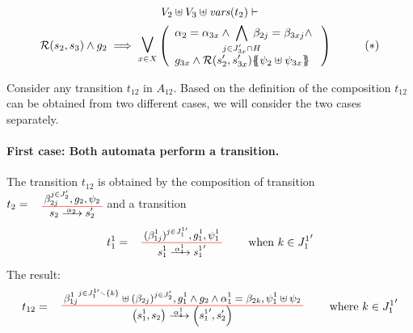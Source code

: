 \documentclass[runningheads]{llncs}
\begin{document}
\begin{enumerate}
\begin{multline*}
V_2 \uplus V_3 \uplus \fvars{t_2} \vdash\\ \mathcal{R}\mpar{s_2, s_3} \wedge g_2 \implies \operatorname*{\bigsymb{\bigvee}}_{x \in X} \mpar{\everymath{\displaystyle}
\begin{array}{l}
			\alpha_2 = \alpha_{3x} \wedge \bigwedge_\subbox{j \in J'_{3x} \cap H} \beta_{2j} = \beta_{3xj} \nwedge\\
			 g_{3x} \wedge \mathcal{R}\mpar{s'_2, s'_{3x}}\psubst{\psi_2 \uplus \psi_{3x}}
		\end{array}}  \qquad \quad (*)
\end{multline*}	
\smallskip



Consider any transition $t_{12}$ in $A_{12}$. Based on the definition of the composition  $t_{12}$ can be obtained from two different cases,  we will consider the two cases
separately.


\paragraph{First case: Both automata perform a transition.} The transition $t_{12}$  is obtained by the composition of transition $t_2=\OTx{2}{}{2}{2}$ and a transition \[t_1^1=
\OT{ s^1_1}{{s^1_1}'}{\alpha_1^1}{   {(\beta^1_{1j})^{j \in J^{1 \prime}_1} }}{ g^1_1 }{ \psi^1_1} \qquad \text{ when } k \in {J^1_{1}}^{\prime}
\] The result:
\[
t_{12} = \OT{\mpar{s^1_1, s_2}}{\mpar{{s^1_1}',s'_2 }}{\alpha^1_1}{{\beta^1_{1j}}^{j \in J^{1 \prime}_1 \setminus \{k\}} \uplus  {(\beta_{2j})^{j \in J^{\prime}_2} }}{g^1_1 \wedge g_2 \wedge \alpha^1_1 = \beta_{2k}}{\psi^1_1 \uplus \psi_2} \qquad \text{ where } k \in {J^1_{1}}^{\prime} 
\]


\end{enumerate}
\end{document}
